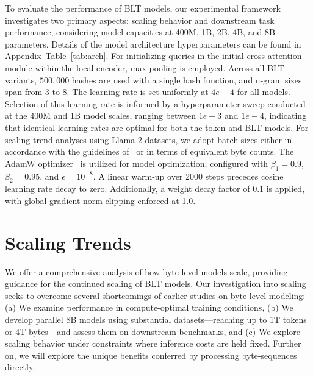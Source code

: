 To evaluate the performance of {\textsc BLT} models, our experimental framework investigates two primary aspects: scaling behavior and downstream task performance, considering model capacities at 400M, 1B, 2B, 4B, and 8B parameters. Details of the model architecture hyperparameters can be found in Appendix~Table~\ref{tab:arch}. For initializing queries in the initial cross-attention module within the local encoder, max-pooling is employed. Across all {\textsc BLT} variants, $500,000$ hashes are used with a single hash function, and n-gram sizes span from 3 to 8. The learning rate is set uniformly at $4e-4$ for all models. Selection of this learning rate is informed by a hyperparameter sweep conducted at the 400M and 1B model scales, ranging between $1e-3$ and $1e-4$, indicating that identical learning rates are optimal for both the token and {\textsc BLT} models. For scaling trend analyses using Llama-2 datasets, we adopt batch sizes either in accordance with the guidelines of~\cite{dubey2024llama} or in terms of equivalent byte counts. The AdamW optimizer~\citep{adamw} is utilized for model optimization, configured with $\beta_1 = 0.9$, $\beta_2 = 0.95$, and $\epsilon=10^{-8}$. A linear warm-up over 2000 steps precedes cosine learning rate decay to zero. Additionally, a weight decay factor of 0.1 is applied, with global gradient norm clipping enforced at 1.0.

\section{Scaling Trends}
\label{section:scaling}

We offer a comprehensive analysis of how byte-level models scale, providing guidance for the continued scaling of {\textsc BLT} models. Our investigation into scaling seeks to overcome several shortcomings of earlier studies on byte-level modeling: (a) We examine performance in compute-optimal training conditions, (b) We develop parallel 8B models using substantial datasets—reaching up to 1T tokens or 4T bytes—and assess them on downstream benchmarks, and (c) We explore scaling behavior under constraints where inference costs are held fixed. Further on, we will explore the unique benefits conferred by processing byte-sequences directly.

